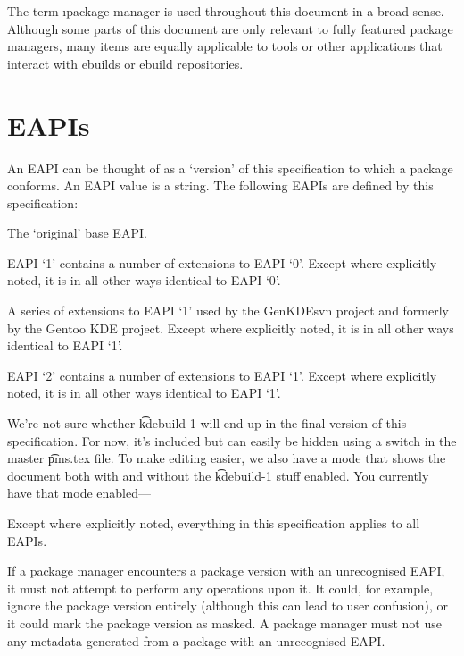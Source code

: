 The term \i{package manager} is used throughout this document in a broad sense. Although some parts
of this document are only relevant to fully featured package managers, many items are equally
applicable to tools or other applications that interact with ebuilds or ebuild repositories.

\section{EAPIs}

An EAPI can be thought of as a `version' of this specification to which a package conforms. An EAPI
value is a string. The following EAPIs are defined by this specification:

\begin{description}
\item[0] The `original' base EAPI.
\item[1] EAPI `1' contains a number of extensions to EAPI `0'. Except where explicitly noted, it is
    in all other ways identical to EAPI `0'.
\IFKDEBUILDELSE
{
    \item[kdebuild-1] A series of extensions to EAPI `1' used by the GenKDEsvn project and
        formerly by the Gentoo KDE project. Except where
        explicitly noted, it is in all other ways identical to EAPI `1'.
}{
}
\item[2] EAPI `2' contains a number of extensions to EAPI `1'. Except where explicitly noted, it is
    in all other ways identical to EAPI `1'.
\end{description}

{
    \note We're not sure whether \t{kdebuild-1} will end up in the final version of this
    specification. For now, it's included but can easily be hidden using a switch in the master
    \t{pms.tex} file. To make editing easier, we also have a mode that shows the document both with
    and without the \t{kdebuild-1} stuff enabled. You currently have that mode enabled---
}{
}

Except where explicitly noted, everything in this specification applies to all EAPIs.

If a package manager encounters a package version with an unrecognised EAPI, it must not attempt to
perform any operations upon it. It could, for example, ignore the package version entirely (although
this can lead to user confusion), or it could mark the package version as masked. A package manager
must not use any metadata generated from a package with an unrecognised EAPI.

